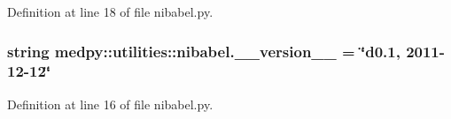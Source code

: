 Definition at line 18 of file nibabel.py.

\hypertarget{namespacemedpy_1_1utilities_1_1nibabel_aef564d622a872d4a5724f34f5167d0f6}{
\subsubsection[{\_\-\_\-version\_\-\_\-}]{\setlength{\rightskip}{0pt plus 5cm}string {\bf medpy::utilities::nibabel.\_\-\_\-version\_\-\_\-} = \char`\"{}d0.1, 2011-\/12-\/12\char`\"{}}}
\label{namespacemedpy_1_1utilities_1_1nibabel_aef564d622a872d4a5724f34f5167d0f6}


Definition at line 16 of file nibabel.py.

